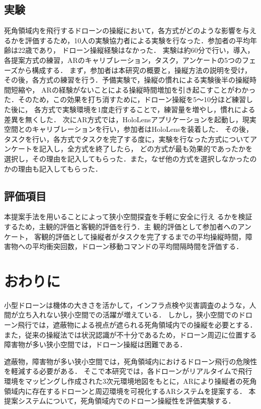 \documentclass[a4paper,10pt,twocolumn,uplatex]{jsarticle}
\begin{document}
\subsection{実験}
死角領域内を飛行するドローンの操縦において，各方式がどのような影響を与えるかを評価するため，10人の実験協力者による実験を行なった．参加者の平均年齢は22歳であり，
ドローン操縦経験はなかった．
実験は約60分で行い，導入，各提案方式の練習，ARのキャリブレーション，タスク，アンケートの5つのフェーズから構成する．
まず，参加者は本研究の概要と，操縦方法の説明を受け，その後，各方式の練習を行う．予備実験で，操縦の慣れによる実験後半の操縦時間短縮や，
ARの経験がないことによる操縦時間増加を引き起こすことがわかった．そのため，この効果を打ち消すために，ドローン操縦を5〜10分ほど練習した後に，
各方式で実験環境を1度走行することで，練習量を増やし，慣れによる差異を無くした．
次にAR方式では，HoloLensアプリケーションを起動し，現実空間とのキャリブレーションを行い，参加者はHoloLensを装着した．
その後，タスクを行い，各方式でタスクを完了する度に，実験を行なった方式についてアンケートを記入し，全方式を終了したら，
どの方式が最も効果的であったかを選択し，その理由を記入してもらった．また，なぜ他の方式を選択しなかったのかの理由も記入してもらった．


\subsection{評価項目}
本提案手法を用いることによって狭小空間探査を手軽に安全に行え
るかを検証するため，主観的評価と客観的評価を行う．主
観的評価として参加者へのアンケート，
客観的評価として操縦者がタスクを完了するまでの平均操縦時間，障害物への平均衝突回数，ドローン移動コマンドの平均間隔時間を評価する．


\section{おわりに}

小型ドローンは機体の大きさを活かして，インフラ点検や災害調査のような，人間が立ち入れない狭小空間での活躍が増えている．
しかし，狭小空間でのドローン飛行では，遮蔽物による視点が遮られる死角領域内での操縦を必要とする．
また，従来の操縦法では状況認識が不十分であるため，ドローン周辺に位置する障害物が多い狭小空間では，ドローン操縦は困難である．\par
遮蔽物，障害物が多い狭小空間では，死角領域内におけるドローン飛行の危険性を軽減する必要がある．
そこで本研究では，各ドローンがリアルタイムで飛行環境をマッピングし作成された3次元環境地図をもとに，ARにより操縦者の死角領域内に存在するドローンと周辺環境を可視化するARシステムを提案する．
本提案システムについて，死角領域内でのドローン操縦性を評価実験する．
\end{document}
